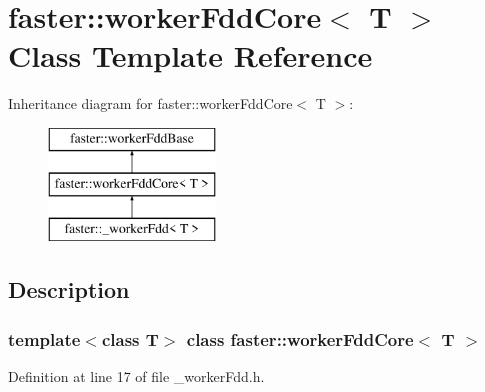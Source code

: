 \hypertarget{classfaster_1_1workerFddCore}{}\section{faster\+:\+:worker\+Fdd\+Core$<$ T $>$ Class Template Reference}
\label{classfaster_1_1workerFddCore}
Inheritance diagram for faster\+:\+:worker\+Fdd\+Core$<$ T $>$\+:\begin{figure}[H]
\begin{center}
\leavevmode
\includegraphics[height=3.000000cm]{classfaster_1_1workerFddCore}
\end{center}
\end{figure}


\subsection{Description}
\subsubsection*{template$<$class T$>$\newline
class faster\+::worker\+Fdd\+Core$<$ T $>$}



Definition at line 17 of file \+\_\+worker\+Fdd.\+h.

